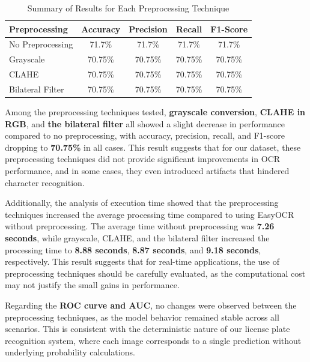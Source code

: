 \documentclass[conference]{IEEEtran}
\begin{document}
	\begin{table}[H]
		\caption{Summary of Results for Each Preprocessing Technique}
		\begin{center}
			\begin{tabular}{|l|c|c|c|c|}
				\hline
				\textbf{Preprocessing} & \textbf{Accuracy} & \textbf{Precision} & \textbf{Recall} & \textbf{F1-Score} \\ \hline
				No Preprocessing    & 71.7\% & 71.7\% & 71.7\% & 71.7\% \\ \hline
				Grayscale            & 70.75\% & 70.75\% & 70.75\% & 70.75\% \\ \hline
				CLAHE                & 70.75\% & 70.75\% & 70.75\% & 70.75\% \\ \hline
				Bilateral Filter     & 70.75\% & 70.75\% & 70.75\% & 70.75\% \\ \hline
			\end{tabular}
			\label{tab2}
		\end{center}
	\end{table}
	
	Among the preprocessing techniques tested, \textbf{grayscale conversion}, \textbf{CLAHE in RGB}, and \textbf{the bilateral filter} all showed a slight decrease in performance compared to no preprocessing, with accuracy, precision, recall, and F1-score dropping to \textbf{70.75\%} in all cases. This result suggests that for our dataset, these preprocessing techniques did not provide significant improvements in OCR performance, and in some cases, they even introduced artifacts that hindered character recognition.
	
	Additionally, the analysis of execution time showed that the preprocessing techniques increased the average processing time compared to using EasyOCR without preprocessing. The average time without preprocessing was \textbf{7.26 seconds}, while grayscale, CLAHE, and the bilateral filter increased the processing time to \textbf{8.88 seconds}, \textbf{8.87 seconds}, and \textbf{9.18 seconds}, respectively. This result suggests that for real-time applications, the use of preprocessing techniques should be carefully evaluated, as the computational cost may not justify the small gains in performance.
	
	Regarding the \textbf{ROC curve and AUC}, no changes were observed between the preprocessing techniques, as the model behavior remained stable across all scenarios. This is consistent with the deterministic nature of our license plate recognition system, where each image corresponds to a single prediction without underlying probability calculations.
	
\end{document}
